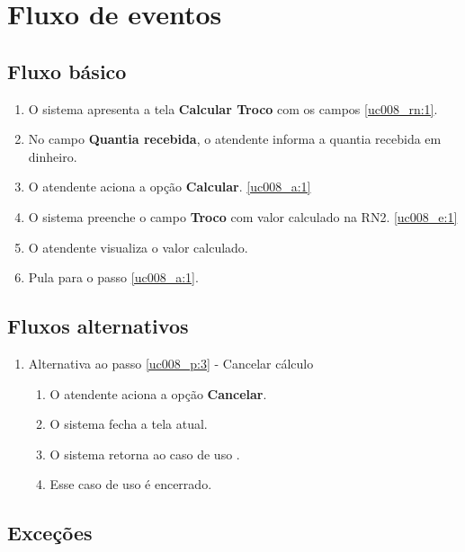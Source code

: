\section{Fluxo de eventos}

\subsection{Fluxo básico}

\begin{enumerate}[label=P\arabic*]
	\item O sistema apresenta a tela \textbf{Calcular Troco} com os campos \ref{uc008_rn:1}. \label{uc008_p:1}
	\item No campo \textbf{Quantia recebida}, o atendente informa a quantia recebida em dinheiro. \label{uc008_p:2}	
	\item O atendente aciona a opção \textbf{Calcular}. \label{uc008_p:3}\ref{uc008_a:1}
	\item O sistema preenche o campo \textbf{Troco} com valor calculado na RN2. \ref{uc008_e:1}
	\item O atendente visualiza o valor calculado.
	\item Pula para o passo \ref{uc008_a:1}.	
\end{enumerate}

\subsection{Fluxos alternativos}

\begin{enumerate}[label=A\arabic*]
	\item Alternativa ao passo \ref{uc008_p:3} - Cancelar cálculo \label{uc008_a:1}
	\begin{enumerate}[label*=.\arabic*]
		\item O atendente aciona a opção \textbf{Cancelar}.
		\item O sistema fecha a tela atual.
		\item O sistema retorna ao caso de uso .
		\item Esse caso de uso é encerrado.
	\end{enumerate} 	
\end{enumerate}

\subsection{Exceções}

